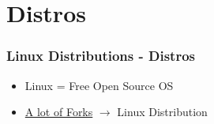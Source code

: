 \begin{frame}

	
\end{frame}

\section{Distros}
\begin{frame}
	\frametitle{Linux Distributions - Distros}

	\begin{itemize}
		\item Linux = Free Open Source OS
        \item \href{https://upload.wikimedia.org/wikipedia/commons/1/1b/Linux_Distribution_Timeline.svg}{A lot of Forks} $\rightarrow$ Linux Distribution
	\end{itemize}
	
	\vfill
	
	\centering 
	
\end{frame}

